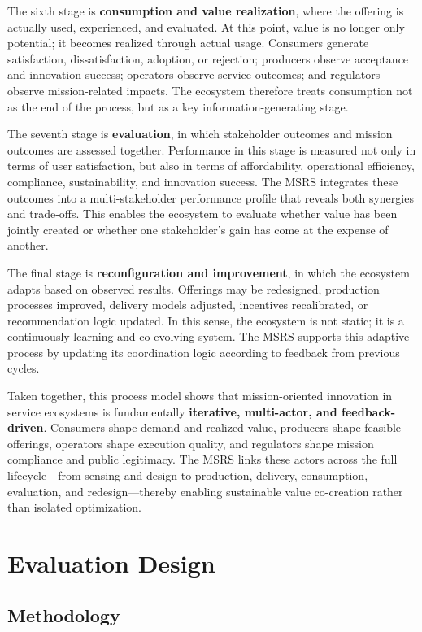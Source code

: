 \documentclass[
  letterpaper,
  DIV=11,
  numbers=noendperiod]{scrartcl}
\begin{document}
The sixth stage is \textbf{consumption and value realization}, where the
offering is actually used, experienced, and evaluated. At this point,
value is no longer only potential; it becomes realized through actual
usage. Consumers generate satisfaction, dissatisfaction, adoption, or
rejection; producers observe acceptance and innovation success;
operators observe service outcomes; and regulators observe
mission-related impacts. The ecosystem therefore treats consumption not
as the end of the process, but as a key information-generating stage.

The seventh stage is \textbf{evaluation}, in which stakeholder outcomes
and mission outcomes are assessed together. Performance in this stage is
measured not only in terms of user satisfaction, but also in terms of
affordability, operational efficiency, compliance, sustainability, and
innovation success. The MSRS integrates these outcomes into a
multi-stakeholder performance profile that reveals both synergies and
trade-offs. This enables the ecosystem to evaluate whether value has
been jointly created or whether one stakeholder's gain has come at the
expense of another.

The final stage is \textbf{reconfiguration and improvement}, in which
the ecosystem adapts based on observed results. Offerings may be
redesigned, production processes improved, delivery models adjusted,
incentives recalibrated, or recommendation logic updated. In this sense,
the ecosystem is not static; it is a continuously learning and
co-evolving system. The MSRS supports this adaptive process by updating
its coordination logic according to feedback from previous cycles.

Taken together, this process model shows that mission-oriented
innovation in service ecosystems is fundamentally \textbf{iterative,
multi-actor, and feedback-driven}. Consumers shape demand and realized
value, producers shape feasible offerings, operators shape execution
quality, and regulators shape mission compliance and public legitimacy.
The MSRS links these actors across the full lifecycle---from sensing and
design to production, delivery, consumption, evaluation, and
redesign---thereby enabling sustainable value co-creation rather than
isolated optimization.

\section{Evaluation Design}\label{evaluation-design}

\subsection{Methodology}\label{methodology}
\end{document}
